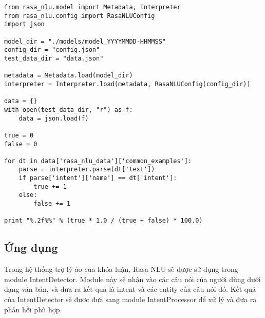 \begin{lstlisting}
from rasa_nlu.model import Metadata, Interpreter
from rasa_nlu.config import RasaNLUConfig
import json

model_dir = "./models/model_YYYYMMDD-HHMMSS"
config_dir = "config.json"
test_data_dir = "data.json"

metadata = Metadata.load(model_dir)
interpreter = Interpreter.load(metadata, RasaNLUConfig(config_dir))

data = {}
with open(test_data_dir, "r") as f:
    data = json.load(f)

true = 0
false = 0

for dt in data['rasa_nlu_data']['common_examples']:
    parse = interpreter.parse(dt['text'])
    if parse['intent']['name'] == dt['intent']:
        true += 1
    else:
        false += 1

print "%.2f%%" % (true * 1.0 / (true + false) * 100.0)
\end{lstlisting}

\subsection{Ứng dụng}

Trong hệ thống trợ lý ảo của khóa luận, Rasa NLU sẽ được sử dụng trong module IntentDetector. Module này sẽ nhận vào các câu nói của người dùng dưới dạng văn bản, và đưa ra kết quả là intent và các entity của câu nói đó. Kết quả của IntentDetector sẽ được đưa sang module IntentProcessor để xử lý và đưa ra phản hồi phù hợp.
